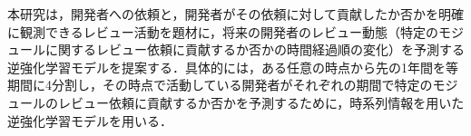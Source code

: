 \documentclass[submit,noauthor,ses,dvipdfmx]{ipsj}
\newcommand{\todo}[1]{\colorbox{yellow}{{\bf TODO}:}{\color{red} {\textbf{[#1]}}}}
\begin{document}
本研究は，開発者への依頼と，開発者がその依頼に対して貢献したか否かを明確に観測できるレビュー活動を題材に，将来の開発者のレビュー動態（特定のモジュールに関するレビュー依頼に貢献するか否かの時間経過順の変化）を予測する逆強化学習モデルを提案する．具体的には，ある任意の時点から先の1年間を等期間に4分割し，その時点で活動している開発者がそれぞれの期間で特定のモジュールのレビュー依頼に貢献するか否かを予測するために，時系列情報を用いた逆強化学習モデルを用いる．






\end{document}
